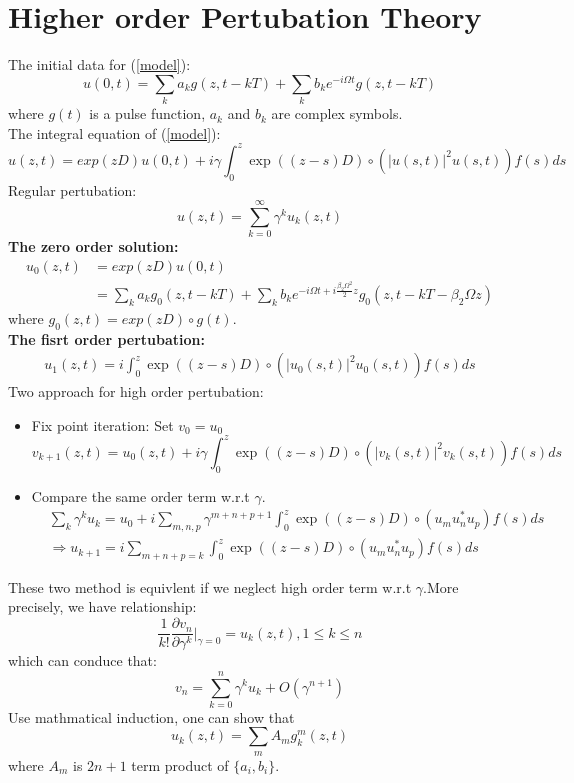 \section{Higher order Pertubation Theory}
The initial data for (\ref{model}):
$$
u(0, t)=\sum_{k} a_{k} g(z, t-k T)+\sum_{k} b_{k} e^{-i \Omega t} g\left(z, t-k T\right)
$$
where $g(t)$ is a pulse function, $a_k$ and $b_k$ are complex symbols.\\
The integral equation of (\ref{model}):
\begin{equation}
u(z,t) = exp(zD)u(0,t) +  i\gamma\int_{0}^{z} \exp((z-s) D)\circ \left(|u(s,t)|^2u(s,t)\right) f(s) ds
\end{equation}
Regular pertubation:
\begin{equation}
u(z,t) = \sum_{k=0}^{\infty} \gamma^k u_k(z,t)
\end{equation}
\textbf{The zero order solution:}
\begin{equation}\label{u0}
\begin{aligned}
u_0(z, t) &= exp(zD)u(0,t) \\
 &= \sum_{k} a_{k} g_{0}(z, t-k T)+\sum_{k} b_{k} e^{-i \Omega t+i \frac{\beta_2 \Omega^{2}}{2} z} g_{0}\left(z, t-k T-\beta_2 \Omega z\right) 
\end{aligned}
\end{equation}
where $g_0(z,t) = exp(zD)\circ g(t)$.\\
\textbf{The fisrt order pertubation:}
\begin{align*}
u_1(z,t) = i\int_{0}^{z} \exp((z-s) D)\circ \left(|u_0(s,t)|^2u_0(s,t)\right) f(s) ds
\end{align*}
Two approach for high order pertubation:
\begin{itemize}
\item Fix point iteration: Set $v_0 = u_0$
\begin{equation}\label{Fix point iteration}
v_{k+1}(z,t) = u_0(z,t) + i\gamma \int_{0}^{z}\exp((z-s) D)\circ \left(|v_k(s,t)|^2v_k(s,t)\right) f(s) ds
\end{equation}
\item Compare the same order term w.r.t $\gamma$.
\begin{align}\label{RP}
&\sum_{k} \gamma^k u_k = u_0 + i\sum_{m,n,p}\gamma^{m+n+p+1}\int_{0}^{z}\exp\left((z-s)D\right)\circ (u_mu_n^{*}u_p) f(s) ds\\
&\Rightarrow u_{k+1} = i\sum_{m+n+p=k}\int_{0}^{z}\exp\left((z-s)D\right)\circ (u_mu_n^{*}u_p) f(s) ds
\end{align}
\end{itemize}
These two method is equivlent if we neglect high order term w.r.t $\gamma$.More precisely, we have relationship:
$$
\frac{1}{k!}\frac{\partial v_n}{\partial \gamma^k}\Big|_{\gamma=0} = u_k(z,t), 1\leq k\leq n
$$
which can conduce that:
$$
v_n = \sum_{k=0}^{n} \gamma^k u_k + O(\gamma^{n+1})
$$
Use mathmatical induction, one can show that
\begin{equation}
u_k(z,t) = \sum_{m} A_{m} g_k^{m}(z,t) 
\end{equation}
where $A_m$ is $2n+1$ term product of $\{a_i,b_i\}$.

